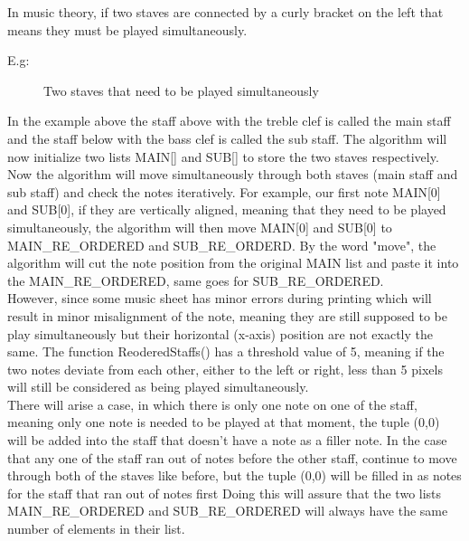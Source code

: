 \documentclass[a4paper,12pt]{report}
\begin{document}
\clearpage

In music theory, if two staves are connected by a curly bracket on the left
that means they must be played simultaneously.

E.g:\\ 
\begin{figure}[h]
\caption{Two staves that need to be played simultaneously}
\label{fig:two staves}
\end{figure}


In the example above the staff above with the treble clef is called the main
staff and the staff below with the bass clef is called the sub staff. The
algorithm will now initialize two lists MAIN[] and SUB[] to store the two staves
respectively.\\

Now the algorithm will move simultaneously through both staves (main staff and sub staff) and check the
notes iteratively. For example, our first note MAIN[0] and SUB[0], if they
are vertically aligned, meaning that they need to be played simultaneously,
the algorithm will then move MAIN[0] and SUB[0] to MAIN\_RE\_ORDERED and
SUB\_RE\_ORDERD. By the word "move", the algorithm will cut the note
position from the original MAIN list and paste it into the
MAIN\_RE\_ORDERED, same goes for SUB\_RE\_ORDERED.\\

However, since some music sheet has  minor errors during printing which will result in minor
misalignment of the note, meaning they are still supposed to be play
simultaneously but their horizontal (x-axis) position are not exactly the
same. The function ReoderedStaffs() has a threshold value of 5, meaning if
the two notes deviate from each other, either to the left or right, less than
5 pixels will still be considered as being played simultaneously.\\

There will arise a case, in which there is only one note on one of the staff, meaning
only one note is needed to be played at that moment, the tuple (0,0) will be added
into the staff that doesn't have a note as a filler note. In the case that any one of the
staff ran out of notes before the other staff, continue to move through both of the
staves like before, but the tuple (0,0) will be filled in as notes for the staff that ran out of notes first
Doing this will assure that the two lists MAIN\_RE\_ORDERED and SUB\_RE\_ORDERED will
always have the same number of elements in their list.\\
\end{document}
